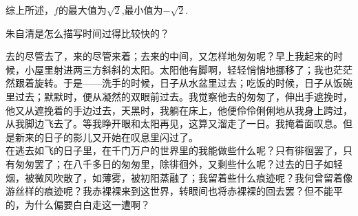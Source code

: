 \documentclass[addtable,answer,twoside,12pt]{hnuexam}
\begin{document}
\begin{questions}
\begin{solution}
综上所述，$f$的最大值为$\sqrt{2}$,最小值为$-\sqrt{2}.$
\end{solution}

\question[13]
朱自清是怎么描写时间过得比较快的？
\begin{solution}
	去的尽管去了，来的尽管来着；去来的中间，又怎样地匆匆呢？早上我起来的时候，小屋里射进两三方斜斜的太阳。太阳他有脚啊，轻轻悄悄地挪移了；我也茫茫然跟着旋转。于是——洗手的时候，日子从水盆里过去；吃饭的时候，日子从饭碗里过去；默默时，便从凝然的双眼前过去。我觉察他去的匆匆了，伸出手遮挽时，他又从遮挽着的手边过去，天黑时，我躺在床上，他便伶伶俐俐地从我身上跨过，从我脚边飞去了。等我睁开眼和太阳再见，这算又溜走了一日。我掩着面叹息。但是新来的日子的影儿又开始在叹息里闪过了。\\
	在逃去如飞的日子里，在千门万户的世界里的我能做些什么呢？只有徘徊罢了，只有匆匆罢了；在八千多日的匆匆里，除徘徊外，又剩些什么呢？过去的日子如轻烟，被微风吹散了，如薄雾，被初阳蒸融了；我留着些什么痕迹呢？我何曾留着像游丝样的痕迹呢？我赤裸裸来到这世界，转眼间也将赤裸裸的回去罢？但不能平的，为什么偏要白白走这一遭啊？
\end{solution}
\end{questions}
\end{document}
